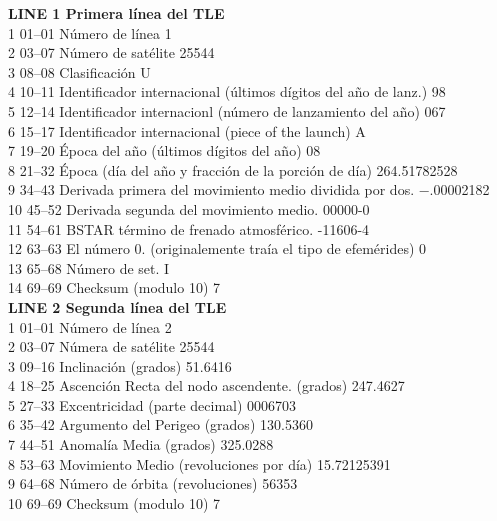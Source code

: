{\begin{center}
{{{\bf{LINE 1 Primera línea del TLE}}\\
1   01–01   Número de línea    1\\
2   03–07   Número de satélite 25544\\
3   08–08   Clasificación      U\\
4   10–11   Identificador internacional (últimos dígitos del año de lanz.) 98\\
5   12–14   Identificador internacionl (número de lanzamiento del año)     067\\
6   15–17   Identificador internacional (piece of the launch)     A\\
7   19–20   Época del año (últimos dígitos del año)     08\\
8   21–32   Época (día del año y fracción de la porción de día)     264.51782528\\
9   34–43   Derivada primera del movimiento medio dividida por dos.   −.00002182\\
10  45–52   Derivada segunda del movimiento medio. 00000-0\\
11  54–61   BSTAR término de frenado atmosférico. -11606-4\\
12  63–63   El número 0. (originalemente traía el tipo de efemérides) 0\\
13  65–68   Número de set. I\\
14  69–69   Checksum (modulo 10)  7\\

{\bf{LINE 2 Segunda l\'inea del TLE}}\\
1   01–01   Número de línea    2\\
2   03–07   Númera de satélite 25544\\
3   09–16   Inclinación (grados)     51.6416\\
4   18–25   Ascención Recta del nodo ascendente. (grados)   247.4627\\
5   27–33   Excentricidad (parte decimal)  0006703\\
6   35–42   Argumento del Perigeo (grados) 130.5360\\
7   44–51   Anomalía Media (grados) 325.0288\\
8   53–63   Movimiento Medio (revoluciones por día) 15.72125391\\
9   64–68   Número de órbita (revoluciones)  56353\\
10  69–69   Checksum (modulo 10)  7\\
}}
\end{center}

}
